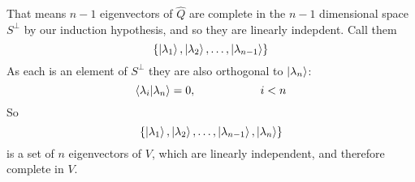 \documentclass[12pt]{book}
\begin{document}
That means $n-1$ eigenvectors of $\hat{Q}$ are complete in the $n-1$
dimensional space $S^\perp$ by our induction hypothesis, and so they
are linearly indepdent.  Call them
$$\{\ket{\lambda_1},\ket{\lambda_2}, \ldots, \ket{\lambda_{n-1}}\}$$
As each is an element of $S^\perp$ they are also orthogonal to $\ket{\lambda_n}$:
$$\braket{\lambda_i|\lambda_n} = 0, \hspace{2cm} i<n$$
So
$$\{\ket{\lambda_1}, \ket{\lambda_2}, \ldots, \ket{\lambda_{n-1}}, \ket{\lambda_n}\}$$
is a set of $n$ eigenvectors of $V$, which are linearly independent, and therefore complete in $V$.
\end{document}
